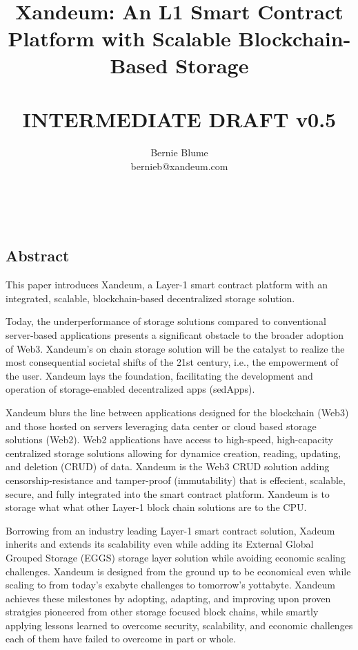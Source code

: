 \documentclass[11pt]{article}   	%
\title{%
\ \\
\ \\
Xandeum: An L1 Smart Contract Platform with Scalable Blockchain-Based Storage \\
\ \\
\large INTERMEDIATE DRAFT v0.5}
\author{
{\rm Bernie Blume}\\
bernieb@xandeum.com
}
\let\oldsection\section
\renewcommand{\section}{\clearpage\oldsection}
\begin{document}
\maketitle

\maketitle

\ \\

\subsection*{Abstract}
This paper introduces Xandeum, a Layer-1 smart contract platform with an integrated, scalable, blockchain-based decentralized storage solution.

Today, the underperformance of storage solutions compared to conventional server-based applications presents a significant obstacle to the broader adoption of Web3. Xandeum's on chain storage solution will be the catalyst to realize the most consequential societal shifts of the 21st century, i.e., the empowerment of the user. Xandeum lays the foundation, facilitating the development and operation of storage-enabled decentralized apps (sedApps).

Xandeum blurs the line between applications designed for the blockchain (Web3) and those hosted on servers leveraging data center or cloud based storage solutions (Web2). Web2 applications have access to high-speed, high-capacity centralized storage solutions allowing for dynamice creation, reading, updating, and deletion (CRUD) of data. Xandeum is the Web3 CRUD solution adding censorship-resistance and tamper-proof (immutability) that is effecient, scalable, secure, and fully integrated into the smart contract platform. Xandeum is to storage what what other Layer-1 block chain solutions are to the CPU.

Borrowing from an industry leading Layer-1 smart contract solution, Xadeum inherits and extends its scalability even while adding its External Global Grouped Storage (EGGS) storage layer solution while avoiding economic scaling challenges. Xandeum is designed from the ground up to be economical even while scaling to from today's exabyte challenges to tomorrow's yottabyte. Xandeum achieves these milestones by adopting, adapting, and improving upon proven stratgies pioneered from other storage focused block chains, while smartly applying lessons learned to overcome security, scalability, and economic challenges each of them have failed to overcome in part or whole.
\end{document}
